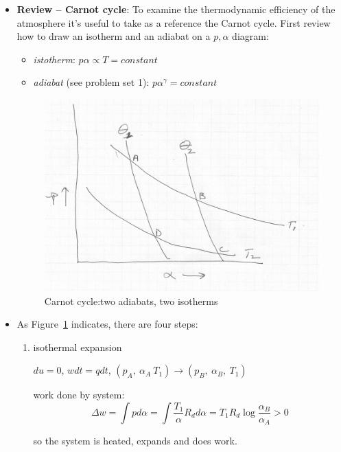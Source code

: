 \documentclass[12pt]{article}
\begin{document}
\pagestyle{first}



\begin{itemize}

\item \textbf{Review -- Carnot cycle}:  To examine the thermodynamic efficiency of the atmosphere it's useful
to take as a reference the Carnot cycle.  First review how to draw an isotherm and an adiabat
on a $p, \alpha$ diagram:

\begin{itemize}
\item \textit{istotherm}:  $p \alpha \propto T = constant$
\item \textit{adiabat} (see problem set 1): $p \alpha^\gamma = constant$
\end{itemize}

\begin{figure}[htbp]
 \includegraphics[width=6in]{carnot_pic.png}  
  \caption{Carnot cycle:two adiabats, two isotherms}
  \label{fig:carnot}
\end{figure}


\item As Figure~\ref{fig:carnot} indicates, there are four steps:

\begin{enumerate}
\item isothermal expansion
\par
$du=0$, $w dt =q dt$, $(p_A,\ \alpha_A\ T_1) \rightarrow (p_B,\ \alpha_B,\ T_1)$
\par
work done by system: 
\begin{equation}
  \label{eq:s1work}
\Delta w = \int p d \alpha = \int \frac{T_1}{\alpha} R_d d\alpha = T_1 R_d \log \frac{\alpha_B}{\alpha_A} > 0
\end{equation}
\par
so the system is heated, expands and does work.



\end{enumerate}
\end{itemize}
\end{document}
